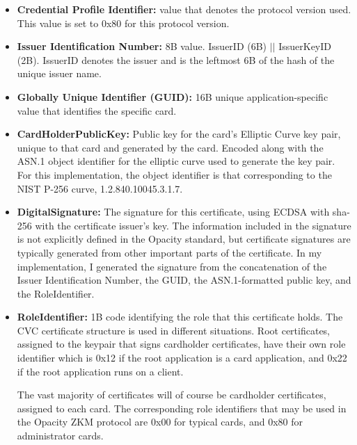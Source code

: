 \documentclass[12pt,a4paper]{article}
\begin{document}
\begin{itemize}
	\item \textbf{Credential Profile Identifier:} value that denotes the protocol version used. This value is set to 0x80 for this protocol version.
	
	\item \textbf{Issuer Identification Number:} 8B value. IssuerID (6B) $||$ IssuerKeyID (2B). IssuerID denotes the issuer and is the leftmost 6B of the hash of the unique issuer name. 
	
	\item \textbf{Globally Unique Identifier (GUID):} 16B unique application-specific value that identifies the specific card.
	
	\item \textbf{CardHolderPublicKey:} Public key for the card's Elliptic Curve key pair, unique to that card and generated by the card. Encoded along with the ASN.1 object identifier for the elliptic curve used to generate the key pair. For this implementation, the object identifier is that corresponding to the NIST P-256 curve, 1.2.840.10045.3.1.7.
	
	\item \textbf{DigitalSignature:} The signature for this certificate, using ECDSA with sha-256 with the certificate issuer's key. The information included in the signature is not explicitly defined in the Opacity standard, but certificate signatures are typically generated from other important parts of the certificate. In my implementation, I generated the signature from the concatenation of the Issuer Identification Number, the GUID, the ASN.1-formatted public key, and the RoleIdentifier.
	
	\item \textbf{RoleIdentifier:} 1B code identifying the role that this certificate holds. The CVC certificate structure is used in different situations. Root certificates, assigned to the keypair that signs cardholder certificates, have their own role identifier which is 0x12 if the root application is a card application, and 0x22 if the root application runs on a client.
	
	The vast majority of certificates will of course be cardholder certificates, assigned to each card. The corresponding role identifiers that may be used in the Opacity ZKM protocol are 0x00 for typical cards, and 0x80 for administrator cards. 
\end{itemize}
\end{document}

